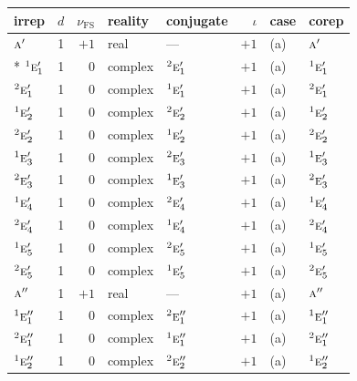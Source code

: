 \documentclass[10pt,a4paper]{article}
\numberwithin{equation}{section}
\newcommand{\irr}[1]{\text{\normalfont\scshape #1}}
\newcommand{\conjpair}[1]{{}^{#1}}
\newcommand{\fsind}{\nu_{\mathrm{FS}}}
\begin{document}
{\small\renewcommand{\arraystretch}{1.25}\setlength{\tabcolsep}{4pt}\begin{longtable}{@{}lrrllrll@{}}\toprule
irrep & $d$ & $\fsind$ & reality & conjugate & $\iota$ & case & corep\\\midrule\endhead
\bottomrule\endfoot\endlastfoot
$\irr{a}'$ & 1 & $+1$ & real & --- & $+1$ & (a) & $\irr{a}'$\\*
$\conjpair{1}\irr{e}_{1}'$ & 1 & $0$ & complex & $\conjpair{2}\irr{e}_{1}'$ & $+1$ & (a) & $\conjpair{1}\irr{e}_{1}'$\\
$\conjpair{2}\irr{e}_{1}'$ & 1 & $0$ & complex & $\conjpair{1}\irr{e}_{1}'$ & $+1$ & (a) & $\conjpair{2}\irr{e}_{1}'$\\
$\conjpair{1}\irr{e}_{2}'$ & 1 & $0$ & complex & $\conjpair{2}\irr{e}_{2}'$ & $+1$ & (a) & $\conjpair{1}\irr{e}_{2}'$\\
$\conjpair{2}\irr{e}_{2}'$ & 1 & $0$ & complex & $\conjpair{1}\irr{e}_{2}'$ & $+1$ & (a) & $\conjpair{2}\irr{e}_{2}'$\\
$\conjpair{1}\irr{e}_{3}'$ & 1 & $0$ & complex & $\conjpair{2}\irr{e}_{3}'$ & $+1$ & (a) & $\conjpair{1}\irr{e}_{3}'$\\
$\conjpair{2}\irr{e}_{3}'$ & 1 & $0$ & complex & $\conjpair{1}\irr{e}_{3}'$ & $+1$ & (a) & $\conjpair{2}\irr{e}_{3}'$\\
$\conjpair{1}\irr{e}_{4}'$ & 1 & $0$ & complex & $\conjpair{2}\irr{e}_{4}'$ & $+1$ & (a) & $\conjpair{1}\irr{e}_{4}'$\\
$\conjpair{2}\irr{e}_{4}'$ & 1 & $0$ & complex & $\conjpair{1}\irr{e}_{4}'$ & $+1$ & (a) & $\conjpair{2}\irr{e}_{4}'$\\
$\conjpair{1}\irr{e}_{5}'$ & 1 & $0$ & complex & $\conjpair{2}\irr{e}_{5}'$ & $+1$ & (a) & $\conjpair{1}\irr{e}_{5}'$\\
$\conjpair{2}\irr{e}_{5}'$ & 1 & $0$ & complex & $\conjpair{1}\irr{e}_{5}'$ & $+1$ & (a) & $\conjpair{2}\irr{e}_{5}'$\\
$\irr{a}''$ & 1 & $+1$ & real & --- & $+1$ & (a) & $\irr{a}''$\\
$\conjpair{1}\irr{e}_{1}''$ & 1 & $0$ & complex & $\conjpair{2}\irr{e}_{1}''$ & $+1$ & (a) & $\conjpair{1}\irr{e}_{1}''$\\
$\conjpair{2}\irr{e}_{1}''$ & 1 & $0$ & complex & $\conjpair{1}\irr{e}_{1}''$ & $+1$ & (a) & $\conjpair{2}\irr{e}_{1}''$\\
$\conjpair{1}\irr{e}_{2}''$ & 1 & $0$ & complex & $\conjpair{2}\irr{e}_{2}''$ & $+1$ & (a) & $\conjpair{1}\irr{e}_{2}''$\\

\end{longtable}}
\end{document}
